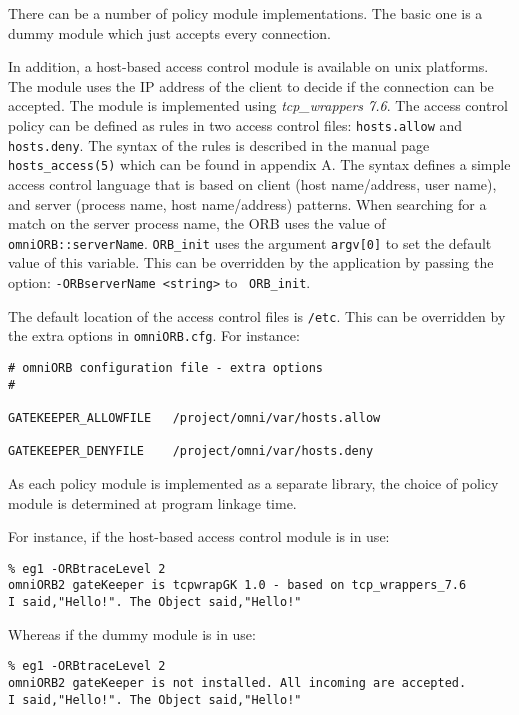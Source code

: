 \documentclass[11pt,twoside,onecolumn]{book}
\begin{document}
There can be a number of policy module implementations. The basic one is a
dummy module which just accepts every connection. 

In addition, a host-based access control module is available on unix
platforms. The module uses the IP address of the client to decide if the
connection can be accepted. The module is implemented using {\em
tcp\_wrappers 7.6}. The access control policy can be defined as rules in
two access control files: {\tt hosts.allow} and {\tt hosts.deny}. The
syntax of the rules is described in the manual page {\tt hosts\_access(5)}
which can be found in appendix A. The syntax defines a simple access
control language that is based on client (host name/address, user name),
and server (process name, host name/address) patterns. When searching for a
match on the server process name, the ORB uses the value of {\tt
omniORB::serverName}. {\tt ORB\_init} uses the argument {\tt argv[0]} to
set the default value of this variable. This can be overridden by the
application by passing the option: {\tt -ORBserverName <string>} to {\tt
ORB\_init}.

The default location of the access control files is {\tt /etc}. This can be
overridden by the extra options in {\tt omniORB.cfg}. For instance:

{\small
\begin{verbatim}
# omniORB configuration file - extra options
#

GATEKEEPER_ALLOWFILE   /project/omni/var/hosts.allow

GATEKEEPER_DENYFILE    /project/omni/var/hosts.deny

\end{verbatim}
}

As each policy module is implemented as a separate library, the choice of
policy module is determined at program linkage time.

For instance, if the host-based access control module is in use:

{\small
\begin{verbatim}
% eg1 -ORBtraceLevel 2
omniORB2 gateKeeper is tcpwrapGK 1.0 - based on tcp_wrappers_7.6 
I said,"Hello!". The Object said,"Hello!"
\end{verbatim}
}

Whereas if the dummy module is in use:

{\small
\begin{verbatim}
% eg1 -ORBtraceLevel 2
omniORB2 gateKeeper is not installed. All incoming are accepted.
I said,"Hello!". The Object said,"Hello!"
\end{verbatim}
}
\end{document}
